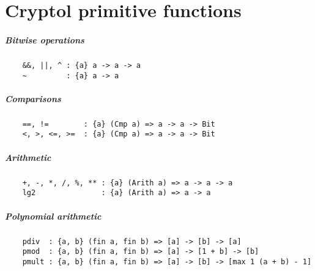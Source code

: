 \chapter{Cryptol primitive functions}


\paragraph*{Bitwise operations}
\begin{Verbatim}
    &&, ||, ^ : {a} a -> a -> a
    ~         : {a} a -> a
\end{Verbatim}
\paragraph*{Comparisons}
\begin{Verbatim}
    ==, !=        : {a} (Cmp a) => a -> a -> Bit
    <, >, <=, >=  : {a} (Cmp a) => a -> a -> Bit
\end{Verbatim}
\paragraph*{Arithmetic}
\begin{Verbatim}
    +, -, *, /, %, ** : {a} (Arith a) => a -> a -> a
    lg2               : {a} (Arith a) => a -> a
\end{Verbatim}
\paragraph*{Polynomial arithmetic}
\begin{Verbatim}
    pdiv  : {a, b} (fin a, fin b) => [a] -> [b] -> [a]
    pmod  : {a, b} (fin a, fin b) => [a] -> [1 + b] -> [b]
    pmult : {a, b} (fin a, fin b) => [a] -> [b] -> [max 1 (a + b) - 1]
\end{Verbatim}
